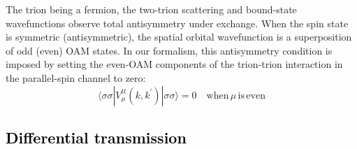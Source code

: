 \documentclass[aps,prb,superscriptaddress,letterpaper,amsmath,amssymb,twocolumn,preprintnumbers]{revtex4}
\newcommand\revisionB[1]{\textcolor{black}{#1}}
\begin{document}
The trion being a fermion, the two-trion scattering and bound-state wavefunctions observe total antisymmetry under exchange. When the spin state is symmetric (antisymmetric), the spatial orbital wavefunction is a superposition of odd (even) OAM states. In our formalism, this antisymmetry condition is imposed by setting the even-OAM components of the trion-trion interaction in the parallel-spin channel to zero:
\begin{equation}
\langle \sigma \sigma | V^{t t}_{\mu} (k , k^{\prime}) | \sigma \sigma \rangle = 0 \quad \mathrm{when} \, \mu \, \mathrm{is \, even}
\end{equation}






\revisionB{
\section{   Differential transmission}
}

\label{app:diff-trans}



\end{document}
